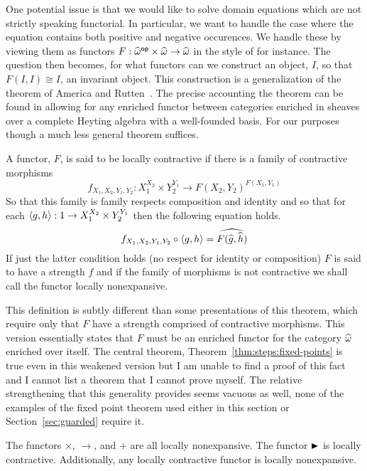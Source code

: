 One potential issue is that we would like to solve domain equations
which are not strictly speaking functorial. In particular, we want to
handle the case where the equation contains both positive and negative
occurences. We handle these by viewing them as functors
$F : \widehat{\omega}^{\mathsf{op}} \times \widehat{\omega} \to
\widehat{\omega}$
in the style of \citet{Pitts:96} for instance. The question then
becomes, for what functors can we construct an object, $I$, so that
$F(I, I) \cong I$, an invariant object. This construction is a
generalization of the theorem of America and
Rutten~\citep{America:87}. The precise accounting the theorem can be
found in \citet{Birkedal:domain:10,Birkedal:steps:11} allowing for any
enriched functor between categories enriched in sheaves over a
complete Heyting algebra with a well-founded basis. For our purposes
though a much less general theorem suffices.
\begin{defn}
  A functor, $F$, is said to be locally contractive if there is a
  family of contractive morphisms
  \[
    f_{X_1, X_2, Y_1, Y_2} :
    X_1^{X_2} \times Y_2^{Y_1} \to F(X_2, Y_2)^{F(X_1, Y_1)}
  \]
  So that this family is family respects composition and identity and
  so that for each $\left\langle g, h \right\rangle : 1 \to X_1^{X_2} \times Y_2^{Y_1}$
  then the following equation holds.
  \[
    f_{X_1, X_2, Y_1, Y_2} \circ \left\langle g, h \right\rangle =
    \widehat{F(\widehat{g}, \widehat{h})}
  \]
  If just the latter condition holds (no respect for identity or
  composition) $F$ is said to have a strength $f$ and if the family of
  morphisms is not contractive we shall call the functor locally
  nonexpansive.
\end{defn}
This definition is subtly different than some presentations of this
theorem, which require only that $F$ have a strength comprised of
contractive morphisms. This version essentially states that $F$ must
be an enriched functor for the category $\widehat{\omega}$ enriched
over itself. The central theorem, Theorem~\ref{thm:steps:fixed-points}
is true even in this weakened version but I am unable to find a proof
of this fact and I cannot list a theorem that I cannot prove
myself. The relative strengthening that this generality provides seems
vacuous as well, none of the examples of the fixed point theorem used
either in this section or Section~\ref{sec:guarded} require it.
\begin{example}
  The functors $\times$, $\to$, and $+$ are all locally
  nonexpansive. The functor ${\blacktriangleright}$ is locally
  contractive. Additionally, any locally contractive functor is locally
  nonexpansive.
\end{example}
